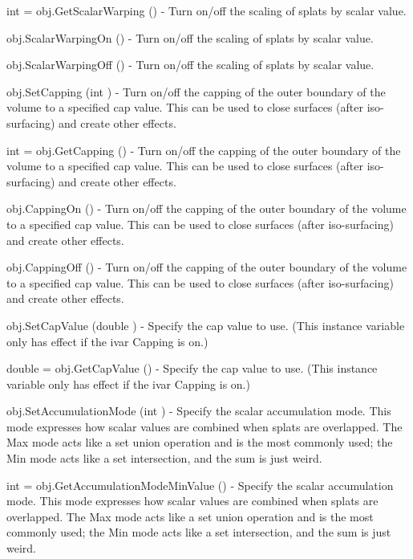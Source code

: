 \begin{DoxyItemize}
\item {\ttfamily int = obj.\-Get\-Scalar\-Warping ()} -\/ Turn on/off the scaling of splats by scalar value.  
\item {\ttfamily obj.\-Scalar\-Warping\-On ()} -\/ Turn on/off the scaling of splats by scalar value.  
\item {\ttfamily obj.\-Scalar\-Warping\-Off ()} -\/ Turn on/off the scaling of splats by scalar value.  
\item {\ttfamily obj.\-Set\-Capping (int )} -\/ Turn on/off the capping of the outer boundary of the volume to a specified cap value. This can be used to close surfaces (after iso-\/surfacing) and create other effects.  
\item {\ttfamily int = obj.\-Get\-Capping ()} -\/ Turn on/off the capping of the outer boundary of the volume to a specified cap value. This can be used to close surfaces (after iso-\/surfacing) and create other effects.  
\item {\ttfamily obj.\-Capping\-On ()} -\/ Turn on/off the capping of the outer boundary of the volume to a specified cap value. This can be used to close surfaces (after iso-\/surfacing) and create other effects.  
\item {\ttfamily obj.\-Capping\-Off ()} -\/ Turn on/off the capping of the outer boundary of the volume to a specified cap value. This can be used to close surfaces (after iso-\/surfacing) and create other effects.  
\item {\ttfamily obj.\-Set\-Cap\-Value (double )} -\/ Specify the cap value to use. (This instance variable only has effect if the ivar Capping is on.)  
\item {\ttfamily double = obj.\-Get\-Cap\-Value ()} -\/ Specify the cap value to use. (This instance variable only has effect if the ivar Capping is on.)  
\item {\ttfamily obj.\-Set\-Accumulation\-Mode (int )} -\/ Specify the scalar accumulation mode. This mode expresses how scalar values are combined when splats are overlapped. The Max mode acts like a set union operation and is the most commonly used; the Min mode acts like a set intersection, and the sum is just weird.  
\item {\ttfamily int = obj.\-Get\-Accumulation\-Mode\-Min\-Value ()} -\/ Specify the scalar accumulation mode. This mode expresses how scalar values are combined when splats are overlapped. The Max mode acts like a set union operation and is the most commonly used; the Min mode acts like a set intersection, and the sum is just weird.  

\end{DoxyItemize}

